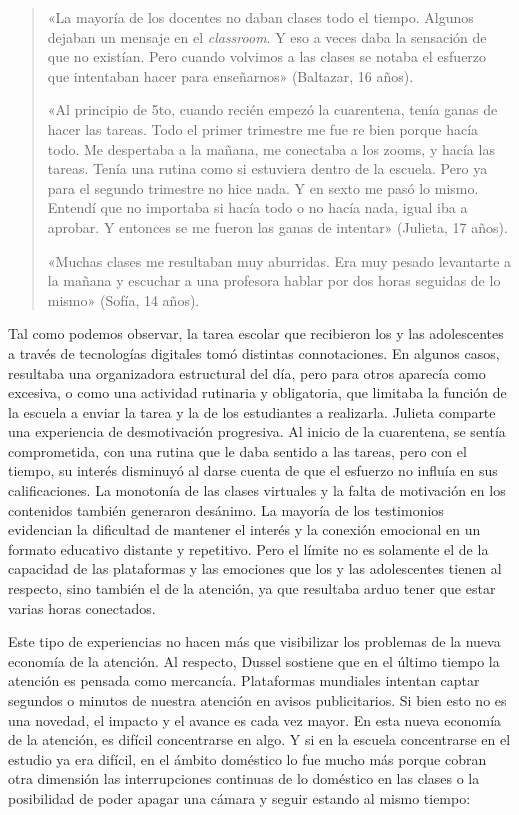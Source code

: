 \begin{quote}
«La mayoría de los docentes no daban clases todo el tiempo. Algunos dejaban un mensaje en el \emph{classroom}. Y eso a veces daba la sensación de que no existían. Pero cuando volvimos a las clases se notaba el esfuerzo que intentaban hacer para enseñarnos» (Baltazar, 16 años).

«Al principio de 5to, cuando recién empezó la cuarentena, tenía ganas de hacer las tareas. Todo el primer trimestre me fue re bien porque hacía todo. Me despertaba a la mañana, me conectaba a los zooms, y hacía las tareas. Tenía una rutina como si estuviera dentro de la escuela. Pero ya para el segundo trimestre no hice nada. Y en sexto me pasó lo mismo. Entendí que no importaba si hacía todo o no hacía nada, igual iba a aprobar. Y entonces se me fueron las ganas de intentar» (Julieta, 17 años).

«Muchas clases me resultaban muy aburridas. Era muy pesado levantarte a la mañana y escuchar a una profesora hablar por dos horas seguidas de lo mismo» (Sofía, 14 años).
\end{quote}

Tal como podemos observar, la tarea escolar que recibieron los y las adolescentes a través de tecnologías digitales tomó distintas connotaciones. En algunos casos, resultaba una organizadora estructural del día, pero para otros aparecía como excesiva, o como una actividad rutinaria y obligatoria, que limitaba la función de la escuela a enviar la tarea y la de los estudiantes a realizarla. Julieta comparte una experiencia de desmotivación progresiva. Al inicio de la cuarentena, se sentía comprometida, con una rutina que le daba sentido a las tareas, pero con el tiempo, su interés disminuyó al darse cuenta de que el esfuerzo no influía en sus calificaciones. La monotonía de las clases virtuales y la falta de motivación en los contenidos también generaron desánimo. La mayoría de los testimonios evidencian la dificultad de mantener el interés y la conexión emocional en un formato educativo distante y repetitivo. Pero el límite no es solamente el de la capacidad de las plataformas y las emociones que los y las adolescentes tienen al respecto, sino también el de la atención, ya que resultaba arduo tener que estar varias horas conectados.

Este tipo de experiencias no hacen más que visibilizar los problemas de la nueva economía de la atención. Al respecto, Dussel sostiene que en el último tiempo la atención es pensada como mercancía. Plataformas mundiales intentan captar segundos o minutos de nuestra atención en avisos publicitarios. Si bien esto no es una novedad, el impacto y el avance es cada vez mayor. En esta nueva economía de la atención, es difícil concentrarse en algo. Y si en la escuela concentrarse en el estudio ya era difícil, en el ámbito doméstico lo fue mucho más porque cobran otra dimensión las interrupciones continuas de lo doméstico en las clases o la posibilidad de poder apagar una cámara y seguir estando al mismo tiempo:

